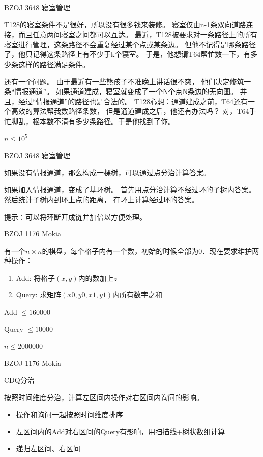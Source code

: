 \documentclass{beamer}
\begin{document}
\begin{frame}{BZOJ 3648 寝室管理}

    T128的寝室条件不是很好，所以没有很多钱来装修。
    寝室仅由n-1条双向道路连接，而且任意两间寝室之间都可以互达。
    最近，T128被要求对一条路径上的所有寝室进行管理，这条路径不会重复经过某个点或某条边。
    但他不记得是哪条路径了，他只记得这条路径上有不少于k个寝室。
    于是，他想请T64帮忙数一下，有多少条这样的路径满足条件。 
    
    还有一个问题。
    由于最近有一些熊孩子不准晚上讲话很不爽，
    他们决定修筑一条“情报通道”。
    如果通道建成，寝室就变成了一个N个点N条边的无向图。
    并且，经过“情报通道”的路径也是合法的。
    T128心想：通道建成之前，T64还有一个高效的算法帮我数路径条数，
    但是通道建成之后，他还有办法吗？
    对，T64手忙脚乱，根本数不清有多少条路径。于是他找到了你。

    $n\leq 10^5$

\end{frame}

\begin{frame}{BZOJ 3648 寝室管理}

    如果没有情报通道，那么构成一棵树，可以通过点分治计算答案。

    如果加入情报通道，变成了基环树。
    首先用点分治计算不经过环的子树内答案。
    然后统计子树内到环上点的距离，
    在环上计算经过环的答案。

    提示：可以将环断开成链并加倍以方便处理。

\end{frame}

\begin{frame}{BZOJ 1176 Mokia}

    有一个$n \times n$的棋盘，每个格子内有一个数，初始的时候全部为0．现在要求维护两种操作：

    \begin{enumerate}
        \item Add: 将格子$(x,y)$内的数加上$z$
        \item Query: 求矩阵$(x0, y0, x1, y1)$内所有数字之和
    \end{enumerate}

    Add $\leq 160000$
    
    Query $\leq 10000$
    
    $n \leq 2000000$
    
\end{frame}

\begin{frame}{BZOJ 1176 Mokia}
    
    CDQ分治 
    
    按照时间维度分治，计算左区间内操作对右区间内询问的影响。

    \begin{itemize}
        \item 操作和询问一起按照时间维度排序
        \item 左区间内的Add对右区间的Query有影响，用扫描线+树状数组计算
        \item 递归左区间、右区间
    \end{itemize}
    
\end{frame}
\end{document}
